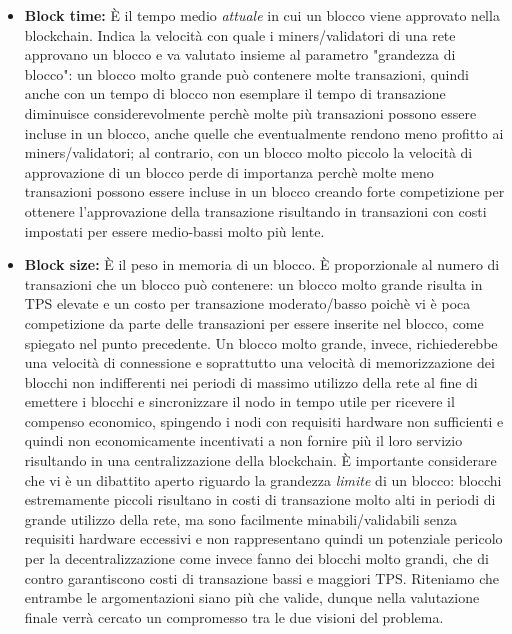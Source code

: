 \documentclass[a4paper, 12pt]{article}
\begin{document}
\begin{itemize}
\newpage

\item \textbf{Block time: }
È il tempo medio \textit{attuale} in cui un blocco viene approvato nella blockchain. Indica la velocità con quale i miners/validatori di una rete approvano un blocco e va valutato insieme al parametro "grandezza di blocco": un blocco molto grande può contenere molte transazioni, quindi anche con un tempo di blocco non esemplare il tempo di transazione diminuisce considerevolmente
perchè molte più transazioni possono essere incluse in un blocco, anche quelle che eventualmente rendono meno profitto ai miners/validatori; al contrario, con un blocco molto piccolo la velocità
di approvazione di un blocco perde di importanza perchè molte meno transazioni possono essere incluse in un blocco creando forte competizione per ottenere l'approvazione della transazione risultando
in transazioni con costi impostati per essere medio-bassi molto più lente.\\

\item \textbf{Block size: }
È il peso in memoria di un blocco. È proporzionale al numero di transazioni che un blocco può contenere: un blocco molto grande risulta in TPS elevate e un costo per transazione
moderato/basso poichè vi è poca competizione da parte delle transazioni per essere inserite nel blocco, come spiegato nel punto precedente. Un blocco molto grande, invece, richiederebbe una velocità di connessione e soprattutto una velocità di memorizzazione dei blocchi non indifferenti nei periodi di massimo utilizzo della rete al fine di emettere i blocchi e sincronizzare il nodo in tempo utile per ricevere il compenso economico, spingendo i nodi con requisiti hardware non sufficienti e quindi non economicamente incentivati a non fornire più il loro servizio risultando in una centralizzazione della blockchain.
È importante considerare che vi è un dibattito aperto riguardo la grandezza \textit{limite} di un blocco: blocchi estremamente piccoli risultano in costi di transazione molto alti in periodi di grande utilizzo della rete, ma sono facilmente minabili/validabili senza requisiti hardware eccessivi e non rappresentano quindi un potenziale pericolo per la decentralizzazione come invece fanno
dei blocchi molto grandi, che di contro garantiscono costi di transazione bassi e maggiori TPS. Riteniamo che entrambe le argomentazioni siano più che valide, dunque nella
valutazione finale verrà cercato un compromesso tra le due visioni del problema.\\


\end{itemize}
\end{document}
